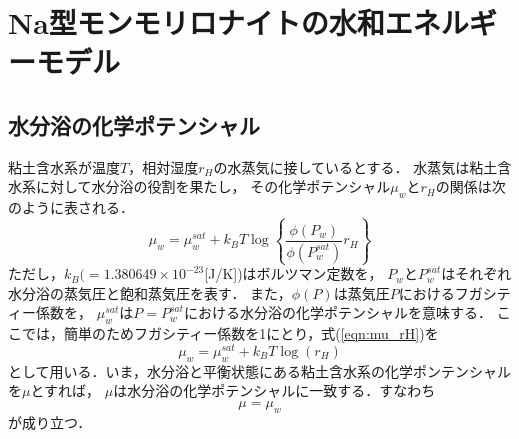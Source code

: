 ﻿\section{Na型モンモリロナイトの水和エネルギーモデル}
\subsection{水分浴の化学ポテンシャル}
粘土含水系が温度$T$，相対湿度$r_H$の水蒸気に接しているとする．
水蒸気は粘土含水系に対して水分浴の役割を果たし，
その化学ポテンシャル$\mu_w$と$r_H$の関係は次のように表される\cite{Tombach}．
\begin{equation}
	\mu_w
	=
	\mu_w^{sat} +k_BT \log
	\left\{
		\frac{\phi(P_w)}{\phi(P^{sat}_w)}
		r_H
	\right\}
	\label{eqn:mu_rH}
\end{equation}
ただし，$k_B(=1.380649\times 10^{-23}$[J/K])はボルツマン定数を，
$P_w$と$P^{sat}_w$はそれぞれ水分浴の蒸気圧と飽和蒸気圧を表す．
また，$\phi(P)$は蒸気圧$P$におけるフガシティー係数を，
$\mu_w^{sat}$は$P=P^{sat}_w$における水分浴の化学ポテンシャルを意味する．
ここでは，簡単のためフガシティー係数を1にとり，式(\ref{eqn:mu_rH})を
\begin{equation}
	\mu_w
	=
	\mu_w^{sat} +k_BT \log
	\left(
		r_H
	\right)
	\label{eqn:mu_rH_simple}
\end{equation}
として用いる．いま，水分浴と平衡状態にある粘土含水系の化学ポンテンシャルを$\mu$とすれば， 
$\mu$は水分浴の化学ポテンシャルに一致する．すなわち
\begin{equation}
	\mu=\mu_{w}
	\label{eqn:equiv_mu}
\end{equation}
が成り立つ．
